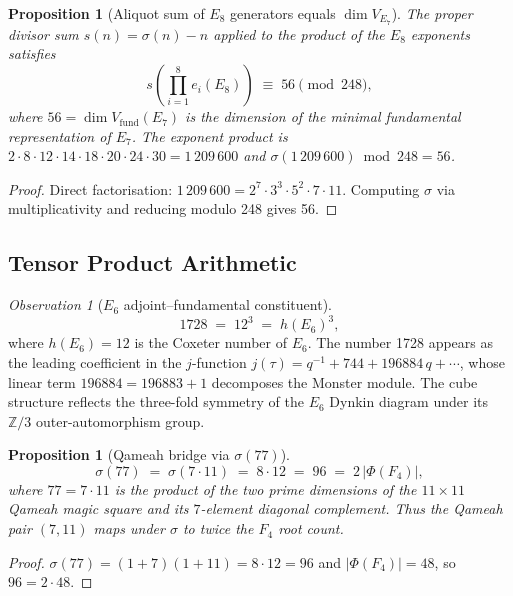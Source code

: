 \documentclass[11pt]{amsart}
\theoremstyle{plain}
\newtheorem{proposition}[theorem]{Proposition}
\theoremstyle{definition}
\theoremstyle{remark}
\newtheorem{observation}[theorem]{Observation}
\renewcommand{\Phi}{\varPhi}
\begin{document}
\begin{proposition}[Aliquot sum of $E_8$ generators equals $\dim V_{E_7}$]\label{prop:aliquot-e8}
The proper divisor sum $s(n)=\sigma(n)-n$ applied to the product of the
$E_8$ exponents satisfies
\[
  s\!\left(\prod_{i=1}^{8} e_i(E_8)\right) \;\equiv\; 56 \pmod{248},
\]
where $56=\dim V_{\mathrm{fund}}(E_7)$ is the dimension of the minimal
fundamental representation of $E_7$.
The exponent product is
$2\cdot 8\cdot 12\cdot 14\cdot 18\cdot 20\cdot 24\cdot 30=1\,209\,600$
and $\sigma(1\,209\,600)\bmod 248 = 56$.
\end{proposition}

\begin{proof}
Direct factorisation: $1\,209\,600=2^7\cdot 3^3\cdot 5^2\cdot 7\cdot 11$.
Computing $\sigma$ via multiplicativity and reducing modulo 248 gives 56.
\end{proof}

\subsection{Tensor Product Arithmetic}\label{sec:tensor-arith}

\begin{observation}[$E_6$ adjoint--fundamental constituent]\label{obs:1728}
\[
  1728 \;=\; 12^3 \;=\; h(E_6)^3,
\]
where $h(E_6)=12$ is the Coxeter number of $E_6$.
The number 1728 appears as the leading coefficient in the $j$-function
$j(\tau)=q^{-1}+744+196884\,q+\cdots$, whose linear term
$196884=196883+1$ decomposes the Monster module.
The cube structure reflects the three-fold symmetry of the
$E_6$ Dynkin diagram under its $\mathbb{Z}/3$ outer-automorphism group.
\end{observation}

\begin{proposition}[Qameah bridge via $\sigma(77)$]\label{prop:sigma-77}
\[
  \sigma(77) \;=\; \sigma(7\cdot 11) \;=\; 8\cdot 12 \;=\; 96 \;=\; 2\,|\Phi(F_4)|,
\]
where $77=7\cdot 11$ is the product of the two prime dimensions of the
$11\times 11$ Qameah magic square and its $7$-element diagonal complement.
Thus the Qameah pair $(7,11)$ maps under $\sigma$ to twice the $F_4$ root count.
\end{proposition}

\begin{proof}
$\sigma(77)=(1+7)(1+11)=8\cdot 12=96$ and $|\Phi(F_4)|=48$, so $96=2\cdot 48$.
\end{proof}
\end{document}

